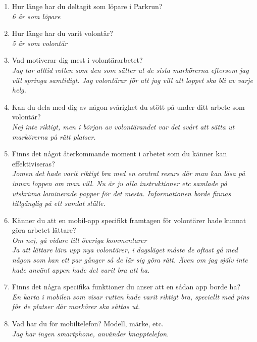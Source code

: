\documentclass{article}
\begin{document}
\begin{enumerate}[label=\textbf{Fråga \arabic*:}]
    \item Hur länge har du deltagit som löpare i Parkrun?\\
        \textit{6 år som löpare}
    \item Hur länge har du varit volontär?\\
        \textit{5 år som volontär}
    \item Vad motiverar dig mest i volontärarbetet?\\
        \textit{Jag tar alltid rollen som den som sätter ut de sista markörerna eftersom jag vill springa samtidigt. Jag volontärar för att jag vill att loppet ska bli av varje helg.}
    \item Kan du dela med dig av någon svårighet du stött på under ditt arbete som volontär?\\
        \textit{Nej inte riktigt, men i början av volontärandet var det svårt att sätta ut markörerna på rätt platser. }
    \item Finns det något återkommande moment i arbetet som du känner kan effektiviseras?\\
        \textit{Jomen det hade varit riktigt bra med en central resurs där man kan läsa på innan loppen om man vill. Nu är ju alla instruktioner etc samlade på utskrivna laminerade papper för det mesta. Informationen borde finnas tillgänglig på ett samlat ställe.}
    \item Känner du att en mobil-app specifikt framtagen för volontärer hade kunnat göra arbetet lättare?\\
    \textit{Om nej, gå vidare till överiga kommentarer}\\
        \textit{Ja att lättare lära upp nya volontärer, i dagsläget måste de oftast gå med någon som kan ett par gånger så de lär sig göra rätt. Även om jag själv inte hade använt appen hade det varit bra att ha.}
    \item Finns det några specifika funktioner du anser att en sådan app borde ha?\\
        \textit{En karta i mobilen som visar rutten hade varit riktigt bra, speciellt med pins för de platser där markörer ska sättas ut.}
    \item Vad har du för mobiltelefon? Modell, märke, etc.\\
        \textit{Jag har ingen smartphone, använder knapptelefon.}
\end{enumerate}

\newpage
\end{document}
